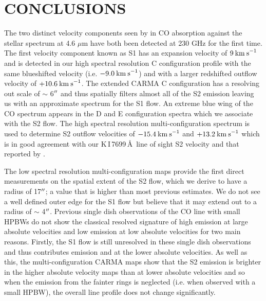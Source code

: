 \documentclass[iop]{emulateapj}
\begin{document}
\section{CONCLUSIONS}
The two distinct velocity components seen by \cite{1979ApJ...233L.135B} in CO absorption against the stellar spectrum at 4.6 $\mu$m have both been detected at 230 GHz for the first time. The first velocity component known as S1 has an expansion velocity of $9\>{\rm km\>s}^{-1}$ \citep{1979ApJ...233L.135B} and is detected in our high spectral resolution C configuration profile with the same blueshifted velocity (i.e. $-9.0\>{\rm km\>s}^{-1}$) and with a larger redshifted outflow velocity of $+10.6\>{\rm km\>s}^{-1}$. The extended CARMA C configuration has a resolving out scale of $\sim$ 6$\mbox{$^{\prime\prime}$}$ and thus spatially filters almost all of the S2 emission leaving us with an approximate spectrum for the S1 flow. An extreme blue wing of the CO spectrum appears in the D and E configuration spectra which we associate with the S2 flow. The high spectral resolution multi-configuration spectrum is used to determine S2 outflow velocities of $-15.4\>{\rm km\>s}^{-1}$ and $+13.2\>{\rm km\>s}^{-1}$ which is in good agreement with our K\,I\,7699\,\AA \ line of sight S2 velocity and that reported by \cite{1979ApJ...233L.135B}. 

The low spectral resolution multi-configuration maps provide the first direct measurements on the spatial extent of the S2 flow, which we derive to have a radius of 17$\mbox{$^{\prime\prime}$}$; a value that is higher than most previous estimates. We do not see a well defined outer edge for the S1 flow but believe that it may extend out to a radius of $\sim$ 4$\mbox{$^{\prime\prime}$}$. Previous single dish observations of the CO line with small HPBWs do not show the classical resolved signature of high emission at large absolute velocities and low emission at low absolute velocities for two main reasons. Firstly, the S1 flow is still unresolved in these single dish observations and thus contributes emission and at the lower absolute velocities. As well as this, the multi-configuration CARMA maps show that the S2 emission is brighter in the higher absolute velocity maps than at lower absolute velocities and so when the emission from the fainter rings is neglected (i.e. when observed with a small HPBW), the overall line profile does not change significantly.
\end{document}
